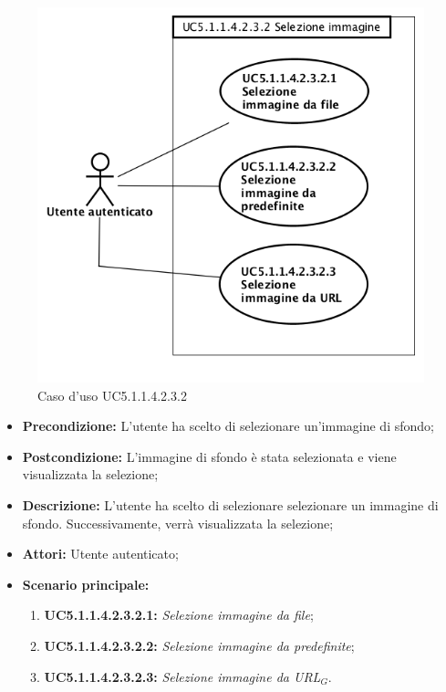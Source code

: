 \begin{figure}[h]
	\begin{center}
	\includegraphics[scale=0.4]{diagram/UC5-1-1-4-2-3-2.png}
	\caption{Caso d'uso UC5.1.1.4.2.3.2}
	\end{center}
\end{figure}
\begin{itemize}
	\item \textbf{Precondizione:} L'utente ha scelto di selezionare un'immagine di sfondo;
	\item \textbf{Postcondizione:} L'immagine di sfondo è stata selezionata e viene visualizzata la selezione;
	\item \textbf{Descrizione:} L'utente ha scelto di selezionare selezionare un immagine di sfondo. Successivamente, verrà visualizzata la selezione;
	\item \textbf{Attori:} Utente autenticato;
	\item \textbf{Scenario principale:}
	\begin{enumerate}
		\item \textbf{ UC5.1.1.4.2.3.2.1:} \textit{ Selezione immagine da file};
		\item \textbf{ UC5.1.1.4.2.3.2.2:} \textit{ Selezione immagine da predefinite};
		\item \textbf{ UC5.1.1.4.2.3.2.3:} \textit{ Selezione immagine da URL$_G$}.
	\end{enumerate}
\end{itemize}
